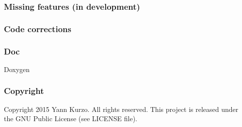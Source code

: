 \subsubsection*{Missing features (in development)}

\subsubsection*{Code corrections}

\subsubsection*{Doc}


\begin{DoxyItemize}
\item Doxygen
\end{DoxyItemize}

\subsubsection*{Copyright}

Copyright 2015 Yann Kurzo. All rights reserved. This project is released under the G\+N\+U Public License (see L\+I\+C\+E\+N\+S\+E file). 